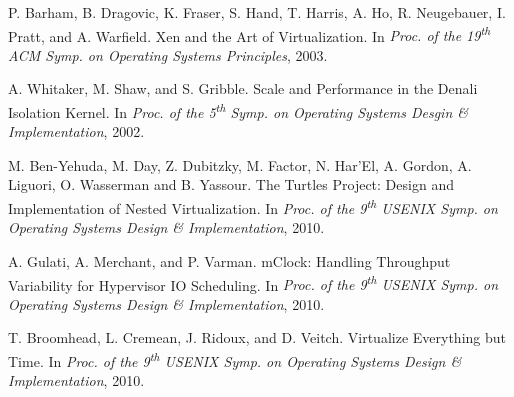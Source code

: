 \documentclass[letterpaper, twocolumn]{article}
\begin{document}
\begin{thebibliography}{10}

{\footnotesize

	P. Barham, B. Dragovic, K. Fraser, S. Hand, T. Harris, A. Ho, R. Neugebauer,
	I. Pratt, and A. Warfield.  Xen and the Art of Virtualization.  In {\it Proc. of
	the 19\textsuperscript{th} ACM Symp. on Operating Systems Principles}, 2003.

	A. Whitaker, M. Shaw, and S. Gribble.  Scale and Performance in the Denali Isolation
	Kernel.  In {\it Proc. of the 5\textsuperscript{th} Symp. on Operating Systems
	Desgin \& Implementation}, 2002.

	M. Ben-Yehuda, M. Day, Z. Dubitzky, M. Factor, N. Har'El, A. Gordon, A. Liguori,
	O. Wasserman and B. Yassour.  The Turtles Project: Design and Implementation
	of Nested Virtualization.  In {\it Proc. of the 9\textsuperscript{th}
   USENIX Symp. on Operating Systems Design \& Implementation}, 2010.

	A. Gulati, A. Merchant, and P. Varman.  mClock: Handling Throughput Variability
	for Hypervisor IO Scheduling.  In {\it Proc. of the 9\textsuperscript{th}
   USENIX Symp. on Operating Systems Design \& Implementation}, 2010.

	T. Broomhead, L. Cremean, J. Ridoux, and D. Veitch.  Virtualize Everything but
	Time.  In {\it Proc. of the 9\textsuperscript{th}
   USENIX Symp. on Operating Systems Design \& Implementation}, 2010.

}

\end{thebibliography}
\end{document}
